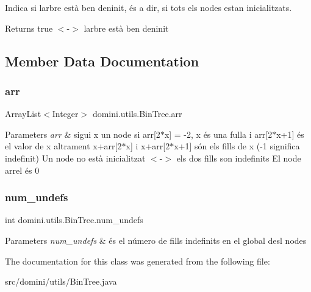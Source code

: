 Indica si l\textquotesingle{}arbre està ben deninit, és a dir, si tots els nodes estan inicialitzats. 

\begin{DoxyReturn}{Returns}
true $<$-\/$>$ l\textquotesingle{}arbre està ben deninit 
\end{DoxyReturn}


\subsection{Member Data Documentation}
\mbox{\label{classdomini_1_1utils_1_1BinTree_a357bcbcf07ba7fcb99d11b237d189e65}} 
\subsubsection{\texorpdfstring{arr}{arr}}
{\footnotesize\ttfamily Array\+List$<$Integer$>$ domini.\+utils.\+Bin\+Tree.\+arr\hspace{0.3cm}{\ttfamily [private]}}


\begin{DoxyParams}{Parameters}
{\em arr} & sigui x un node si arr\mbox{[}2$\ast$x\mbox{]} = -\/2, x és una fulla i arr\mbox{[}2$\ast$x+1\mbox{]} és el valor de x altrament x+arr\mbox{[}2$\ast$x\mbox{]} i x+arr\mbox{[}2$\ast$x+1\mbox{]} són els fills de x (-\/1 significa indefinit) Un node no està inicialitzat $<$-\/$>$ els dos fills son indefinits El node arrel és 0 \\
\hline
\end{DoxyParams}
\mbox{\label{classdomini_1_1utils_1_1BinTree_a36f1212262c353accbc0a0385fa45a8d}} 
\subsubsection{\texorpdfstring{num\+\_\+undefs}{num\_undefs}}
{\footnotesize\ttfamily int domini.\+utils.\+Bin\+Tree.\+num\+\_\+undefs\hspace{0.3cm}{\ttfamily [private]}}


\begin{DoxyParams}{Parameters}
{\em num\+\_\+undefs} & és el número de fills indefinits en el global desl nodes \\
\hline
\end{DoxyParams}


The documentation for this class was generated from the following file\+:\begin{DoxyCompactItemize}
\item 
src/domini/utils/Bin\+Tree.\+java\end{DoxyCompactItemize}
